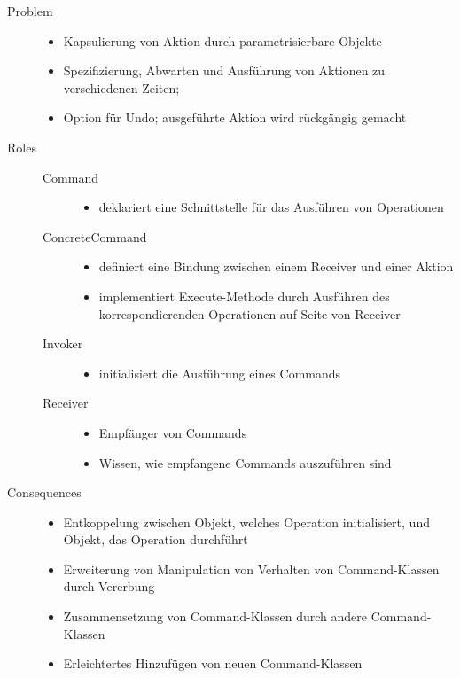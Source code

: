 \begin{description}
    \item[Problem] \hfill 
    \begin{itemize}
        \item Kapsulierung von Aktion durch parametrisierbare Objekte
        \item Spezifizierung, Abwarten und Ausführung von Aktionen zu verschiedenen Zeiten;
        \item Option für Undo; ausgeführte Aktion wird rückgängig gemacht
    \end{itemize}
    \item[Roles] \hfill
    \begin{description}
        \item[Command] \hfill
        \begin{itemize}
            \item deklariert eine Schnittstelle für das Ausführen von Operationen
        \end{itemize}
        \item[ConcreteCommand] \hfill
        \begin{itemize}
            \item definiert eine Bindung zwischen einem Receiver und einer Aktion
            \item implementiert Execute-Methode durch Ausführen des korrespondierenden Operationen auf Seite von Receiver
        \end{itemize}
        \item[Invoker] \hfill
        \begin{itemize}
            \item initialisiert die Ausführung eines Commands
        \end{itemize}
        \item[Receiver] \hfill
        \begin{itemize}
            \item Empfänger von Commands
            \item Wissen, wie empfangene Commands auszuführen sind  
        \end{itemize}
    \end{description}
    \item[Consequences] \hfill
    \begin{itemize}
        \item Entkoppelung zwischen Objekt, welches Operation initialisiert, und Objekt, das Operation durchführt
        \item Erweiterung von Manipulation von Verhalten von Command-Klassen durch Vererbung
        \item Zusammensetzung von Command-Klassen durch andere Command-Klassen
        \item Erleichtertes Hinzufügen von neuen Command-Klassen
    \end{itemize}
\end{description}

